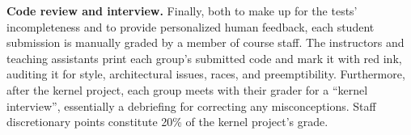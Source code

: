 %

\textbf{Code review and interview.}
Finally, both to make up for the tests' incompleteness and to provide personalized human feedback,
each student submission is manually graded by a member of course staff.
The instructors and teaching assistants print each group's submitted code and mark it with red ink, auditing it for style, architectural issues, races, and preemptibility.
Furthermore, after the kernel project, each group meets with their grader for a ``kernel interview'', essentially a debriefing for correcting any misconceptions.
Staff discretionary points constitute 20\% of the kernel project's grade.

